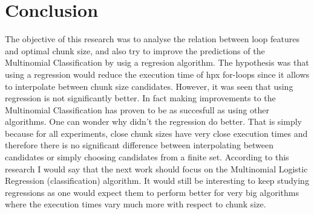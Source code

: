 \section{Conclusion}
The objective of this research was to analyse the relation between loop features and optimal chunk size, and also try to improve the predictions of the Multinomial Classification by usig a regresion algorithm. The hypothesis was that using a regression would reduce the execution time of hpx for-loops since it allows to interpolate between chunk size candidates. However, it was seen that using regression is not significantly better. In fact making improvements to the Multinomial Classification has proven to be as succesfull as using other algorithms. One can wonder why didn't the regression do better. That is simply because for all experiments, close chunk sizes have very close execution times and therefore there is no significant difference between interpolating between candidates or simply choosing candidates from a finite set. According to this research I would say that the next work should focus on the Multinomial Logistic Regression (classification) algorithm. It would still be interesting to keep studying regressions as one would expect them to perform better for very big algorithms where the execution times vary much more with respect to chunk size.